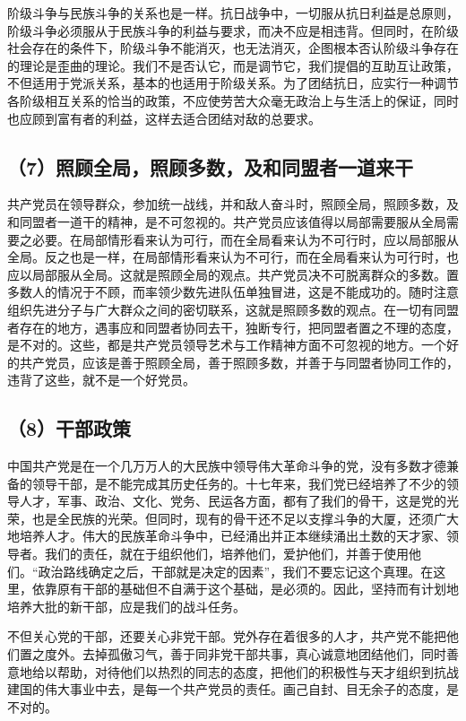 阶级斗争与民族斗争的关系也是一样。抗日战争中，一切服从抗日利益是总原则，阶级斗争必须服从于民族斗争的利益与要求，而决不应是相违背。但同时，在阶级社会存在的条件下，阶级斗争不能消灭，也无法消灭，企图根本否认阶级斗争存在的理论是歪曲的理论。我们不是否认它，而是调节它，我们提倡的互助互让政策，不但适用于党派关系，基本的也适用于阶级关系。为了团结抗日，应实行一种调节各阶级相互关系的恰当的政策，不应使劳苦大众毫无政治上与生活上的保证，同时也应顾到富有者的利益，这样去适合团结对敌的总要求。

\subsection{（7）照顾全局，照顾多数，及和同盟者一道来干}

共产党员在领导群众，参加统一战线，并和敌人奋斗时，照顾全局，照顾多数，及和同盟者一道干的精神，是不可忽视的。共产党员应该值得以局部需要服从全局需要之必要。在局部情形看来认为可行，而在全局看来认为不可行时，应以局部服从全局。反之也是一样，在局部情形看来认为不可行，而在全局看来认为可行时，也应以局部服从全局。这就是照顾全局的观点。共产党员决不可脱离群众的多数。置多数人的情况于不顾，而率领少数先进队伍单独冒进，这是不能成功的。随时注意组织先进分子与广大群众之间的密切联系，这就是照顾多数的观点。在一切有同盟者存在的地方，遇事应和同盟者协同去干，独断专行，把同盟者置之不理的态度，是不对的。这些，都是共产党员领导艺术与工作精神方面不可忽视的地方。一个好的共产党员，应该是善于照顾全局，善于照顾多数，并善于与同盟者协同工作的，违背了这些，就不是一个好党员。

\subsection{（8）干部政策}

中国共产党是在一个几万万人的大民族中领导伟大革命斗争的党，没有多数才德兼备的领导干部，是不能完成其历史任务的。十七年来，我们党已经培养了不少的领导人才，军事、政治、文化、党务、民运各方面，都有了我们的骨干，这是党的光荣，也是全民族的光荣。但同时，现有的骨干还不足以支撑斗争的大厦，还须广大地培养人才。伟大的民族革命斗争中，已经涌出并正本继续涌出土数的天才家、领导者。我们的责任，就在于组织他们，培养他们，爱护他们，并善于使用他们。“政治路线确定之后，干部就是决定的因素”，我们不要忘记这个真理。在这里，依靠原有干部的基础但不自满于这个基础，是必须的。因此，坚持而有计划地培养大批的新干部，应是我们的战斗任务。

不但关心党的干部，还要关心非党干部。党外存在着很多的人才，共产党不能把他们置之度外。去掉孤傲习气，善于同非党干部共事，真心诚意地团结他们，同时善意地给以帮助，对待他们以热烈的同志的态度，把他们的积极性与天才组织到抗战建国的伟大事业中去，是每一个共产党员的责任。画己自封、目无余子的态度，是不对的。

